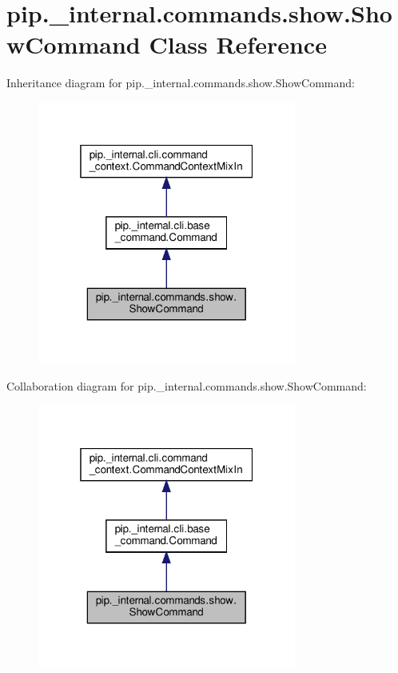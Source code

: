\hypertarget{classpip_1_1__internal_1_1commands_1_1show_1_1ShowCommand}{}\section{pip.\+\_\+internal.\+commands.\+show.\+Show\+Command Class Reference}
\label{classpip_1_1__internal_1_1commands_1_1show_1_1ShowCommand}


Inheritance diagram for pip.\+\_\+internal.\+commands.\+show.\+Show\+Command\+:
\nopagebreak
\begin{figure}[H]
\begin{center}
\leavevmode
\includegraphics[width=241pt]{classpip_1_1__internal_1_1commands_1_1show_1_1ShowCommand__inherit__graph}
\end{center}
\end{figure}


Collaboration diagram for pip.\+\_\+internal.\+commands.\+show.\+Show\+Command\+:
\nopagebreak
\begin{figure}[H]
\begin{center}
\leavevmode
\includegraphics[width=241pt]{classpip_1_1__internal_1_1commands_1_1show_1_1ShowCommand__coll__graph}
\end{center}
\end{figure}
